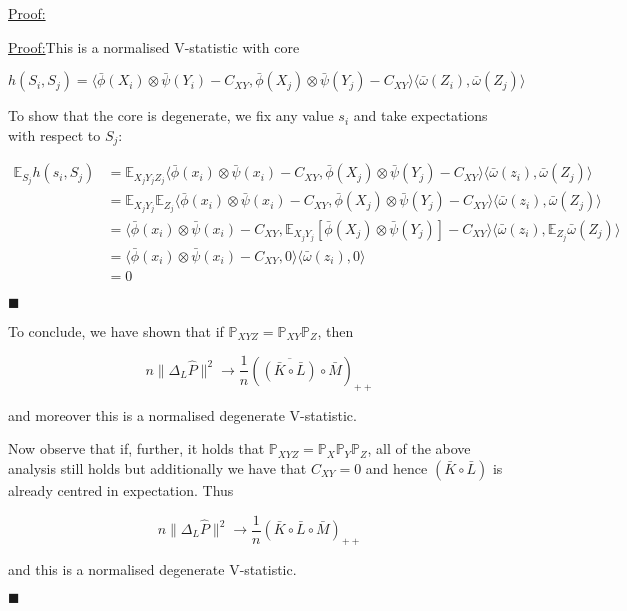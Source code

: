 \documentclass[12pt]{article}
\newenvironment{claimproof}[1]{\par\noindent\underline{Proof:}\space#1}{\hfill $\blacksquare$}
\numberwithin{claim}{section}
\numberwithin{lemma}{section}
\numberwithin{theorem}{section}
\begin{document}
\begin{claimproof}
\begin{claimproof}
This is a normalised V-statistic with core 

\[h(S_i,S_j) = \langle \bar{\phi}(X_i) \otimes \bar{\psi}(Y_i) - C_{XY},\bar{\phi}(X_j) \otimes \bar{\psi}(Y_j) - C_{XY} \rangle \langle \bar{\omega}(Z_i), \bar{\omega}(Z_j) \rangle \]

To show that the core is degenerate, we fix any value $s_i$ and take expectations with respect to $S_j$:

\begin{align*}
\mathbb{E}_{S_j} h(s_i,S_j) & = \mathbb{E}_{X_j Y_j Z_j} \langle \bar{\phi}(x_i) \otimes \bar{\psi}(x_i) - C_{XY},\bar{\phi}(X_j) \otimes \bar{\psi}(Y_j) - C_{XY} \rangle \langle \bar{\omega}(z_i), \bar{\omega}(Z_j) \rangle \\
& = \mathbb{E}_{X_j Y_j}\mathbb{E}_{Z_j} \langle \bar{\phi}(x_i) \otimes \bar{\psi}(x_i) - C_{XY},\bar{\phi}(X_j) \otimes \bar{\psi}(Y_j) - C_{XY} \rangle \langle \bar{\omega}(z_i), \bar{\omega}(Z_j) \rangle \\
& = \langle \bar{\phi}(x_i) \otimes \bar{\psi}(x_i) - C_{XY},\mathbb{E}_{X_j Y_j}[\bar{\phi}(X_j) \otimes \bar{\psi}(Y_j)] - C_{XY} \rangle \langle \bar{\omega}(z_i), \mathbb{E}_{Z_j}\bar{\omega}(Z_j) \rangle \\
& = \langle \bar{\phi}(x_i) \otimes \bar{\psi}(x_i) - C_{XY},0 \rangle \langle \bar{\omega}(z_i), 0 \rangle \\
& = 0
\end{align*}


\end{claimproof}

To conclude, we have shown that if $\mathbb{P}_{XYZ} = \mathbb{P}_{XY} \mathbb{P}_Z$, then

\[ n\|\Delta_L \hat{P}\|^2 \longrightarrow \frac{1}{n}(\overline{(\bar{K}\circ \bar{L})} \circ \bar{M})_{++} \]

and moreover this is a normalised degenerate V-statistic.


Now observe that if, further, it holds that $\mathbb{P}_{XYZ} = \mathbb{P}_{X}\mathbb{P}_{Y} \mathbb{P}_Z$, all of the above analysis still holds but additionally we have that $C_{XY} = 0$ and hence $(\bar{K}\circ \bar{L})$ is already centred in expectation. Thus 

\[ n\|\Delta_L \hat{P}\|^2 \longrightarrow \frac{1}{n}(\bar{K}\circ \bar{L} \circ \bar{M})_{++} \]

and this is a normalised degenerate V-statistic.

\end{claimproof}
\newpage
\end{document}
